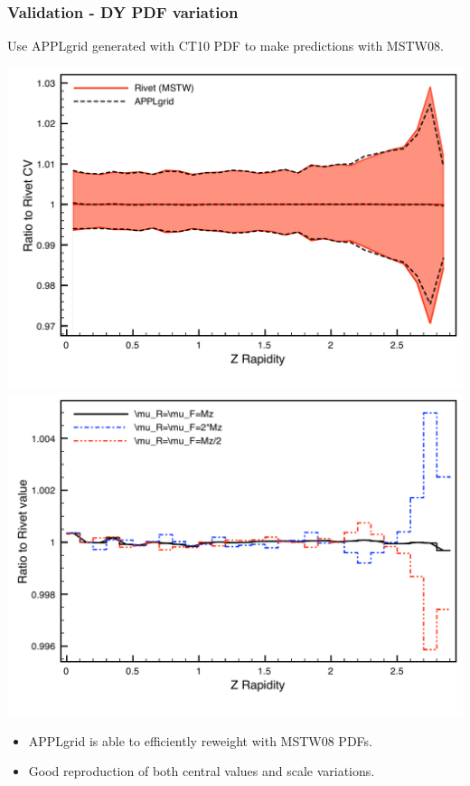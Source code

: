 \documentclass[10pt]{beamer}
\newcommand{\vso}{\vskip15pt}
\begin{document}
\begin{frame}
\frametitle{Validation - DY PDF variation}
Use APPLgrid generated with CT10 PDF to make predictions with MSTW08.
\vso

\includegraphics[width=0.45\paperwidth]{100MDYMSTW_Plot.pdf}
\includegraphics[width=0.45\paperwidth]{100MDYRatioMSTW_Plot.pdf}
\vso
\begin{itemize}
\item<1-> APPLgrid is able to efficiently reweight with MSTW08 PDFs.
\item<1-> Good reproduction of both central values and scale variations.
\end{itemize}
\end{frame}
\end{document}
